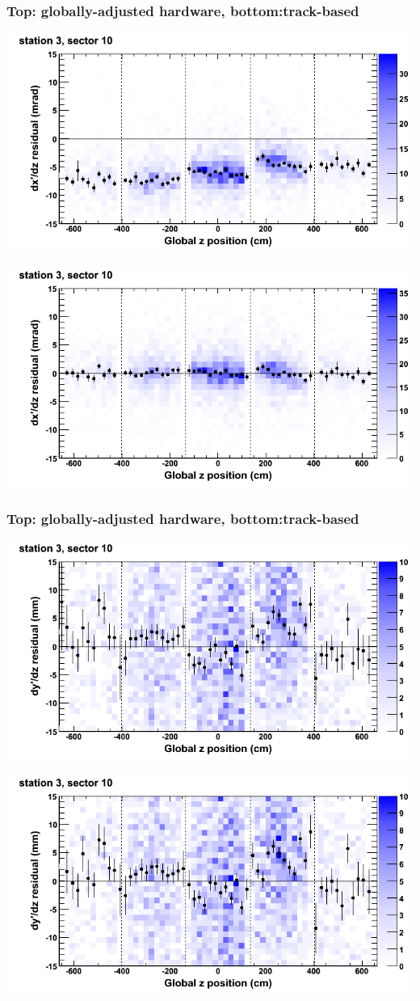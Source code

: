 \documentclass[compress]{beamer}
\begin{document}
\begin{frame}
\frametitle{Top: globally-adjusted hardware, bottom:track-based}
\includegraphics[width=0.7\linewidth]{NOV4_mapplots_HW/DTvsz_st3sec10_dxdz.png}

\includegraphics[width=0.7\linewidth]{NOV4_mapplots/DTvsz_st3sec10_dxdz.png}
\end{frame}

\begin{frame}
\frametitle{Top: globally-adjusted hardware, bottom:track-based}
\includegraphics[width=0.7\linewidth]{NOV4_mapplots_HW/DTvsz_st3sec10_dydz.png}

\includegraphics[width=0.7\linewidth]{NOV4_mapplots/DTvsz_st3sec10_dydz.png}
\end{frame}
\end{document}
